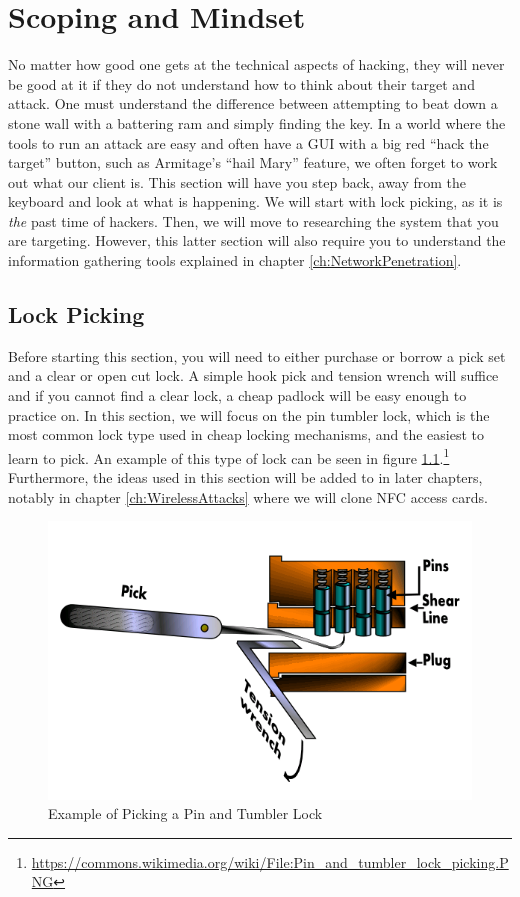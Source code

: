 \chapter{Scoping and Mindset}
	\label{ch:ScopingMindset}
		No matter how good one gets at the technical aspects of hacking, they will never be good at it if they do not understand how to think about their target and attack. 
		One must understand the difference between attempting to beat down a stone wall with a battering ram and simply finding the key. 
		In a world where the tools to run an attack are easy and often have a GUI with a big red ``hack the target'' button, such as Armitage's ``hail Mary'' feature, 
		we often forget to work out what our client is. 
		This section will have you step back, away from the keyboard and look at what is happening. 
		We will start with lock picking, as it is \emph{the} past time of hackers. 
		Then, we will move to researching the system that you are targeting. 
		However, this latter section will also require you to understand the information gathering tools explained in chapter \ref{ch:NetworkPenetration}.
	\section{Lock Picking}
		Before starting this section, you will need to either purchase or borrow a pick set and a clear or open cut lock. 
		A simple hook pick and tension wrench will suffice and if you cannot find a clear lock, a cheap padlock will be easy enough to practice on. 
		In this section, we will focus on the pin tumbler lock, which is the most common lock type used in cheap locking mechanisms, and the easiest to learn to pick. 
		An example of this type of lock can be seen in figure \ref{fig:PinTumblerLock}.\footnote{\url{https://commons.wikimedia.org/wiki/File:Pin\_and\_tumbler\_lock\_picking.PNG}}
		Furthermore, the ideas used in this section will be added to in later chapters, notably in chapter \ref{ch:WirelessAttacks} where we will clone NFC access cards. 
		\begin{figure}[htb]
			\centering
			\includegraphics[scale=0.6]{./PinTumblerLock.png}
			\caption{Example of Picking a Pin and Tumbler Lock}
			\label{fig:PinTumblerLock}
		\end{figure}
